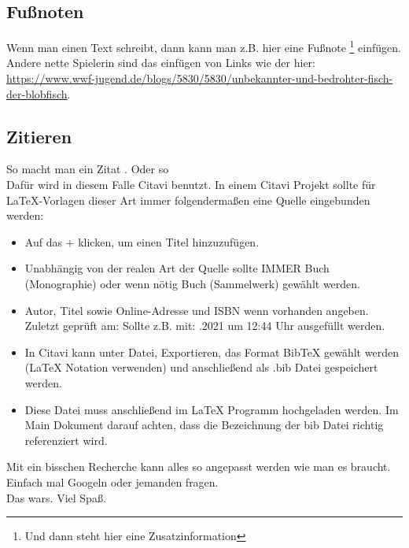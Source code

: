 \subsection{Fußnoten}
\label{subsec_Fußnoten}
Wenn man einen Text schreibt, dann kann man z.B. hier eine Fußnote \footnote{Und dann steht hier eine Zusatzinformation} einfügen. Andere nette Spielerin sind das einfügen von Links wie der hier: \url{https://www.wwf-jugend.de/blogs/5830/5830/unbekannter-und-bedrohter-fisch-der-blobfisch}.


\subsection{Zitieren}
\label{subsec_Zitieren}

So macht man ein Zitat \cite{Follinger.2016}. Oder so \cite{ifmelectronic.2004}\\
Dafür wird in diesem Falle Citavi benutzt. In einem Citavi Projekt sollte für LaTeX-Vorlagen dieser Art immer folgendermaßen eine Quelle eingebunden werden:
\begin{itemize}
    \item Auf das $+$ klicken, um einen Titel hinzuzufügen.
    \item Unabhängig von der realen Art der Quelle sollte IMMER \glqq Buch (Monographie)\grqq{} oder wenn nötig \glqq Buch (Sammelwerk)\grqq{} gewählt werden.
    \item Autor, Titel sowie Online-Adresse und ISBN wenn vorhanden angeben. Zuletzt geprüft am: Sollte z.B. mit: .2021 um 12:44 Uhr\grqq{} ausgefüllt werden.
    \item In Citavi kann unter Datei, Exportieren, das Format \glqq BibTeX\grqq{} gewählt werden (LaTeX Notation verwenden) und anschließend als .bib Datei gespeichert werden.
    \item Diese Datei muss anschließend im LaTeX Programm hochgeladen werden. Im Main Dokument darauf achten, dass die Bezeichnung der bib Datei richtig referenziert wird.
\end{itemize}
Mit ein bisschen Recherche kann alles so angepasst werden wie man es braucht. Einfach mal Googeln oder jemanden fragen.\\
Das wars. Viel Spaß.

\newpage
\emptywithpagenumber %
